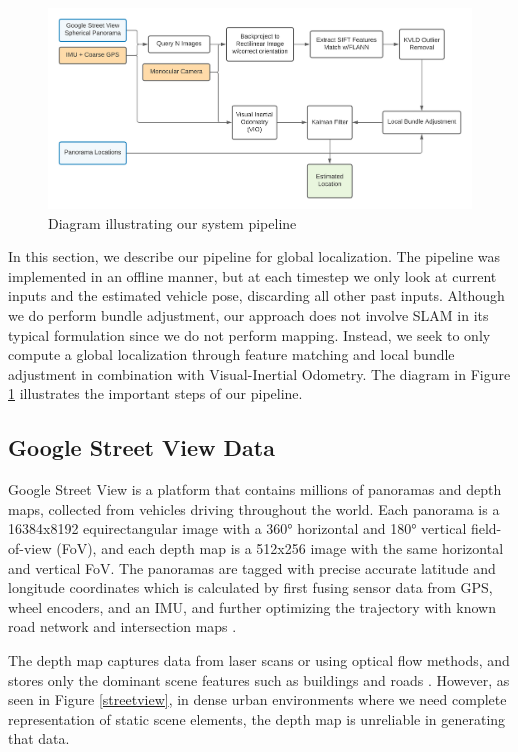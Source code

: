 \documentclass[conference]{IEEEtran}
\begin{document}
\begin{figure}[htb]
\centerline{\includegraphics[scale=0.7]{Images/system.png}}
\caption{Diagram illustrating our system pipeline}
\label{system}
\end{figure}

In this section, we describe our pipeline for global localization. The pipeline was implemented in an offline manner, but at each timestep we only look at current inputs and the estimated vehicle pose, discarding all other past inputs. Although we do perform bundle adjustment, our approach does not involve SLAM in its typical formulation since we do not perform mapping. Instead, we seek to only compute a global localization through feature matching and local bundle adjustment in combination with Visual-Inertial Odometry. The diagram in Figure \ref{system} illustrates the important steps of our pipeline.

\subsection{Google Street View Data}

Google Street View is a platform that contains millions of panoramas and depth maps, collected from vehicles driving throughout the world. Each panorama is a 16384x8192 equirectangular image with a 360° horizontal and 180° vertical field-of-view (FoV), and each depth map is a 512x256 image with the same horizontal and vertical FoV. The panoramas are tagged with precise accurate latitude and longitude coordinates which is calculated by first fusing sensor data from GPS, wheel encoders, and an IMU, and further optimizing the trajectory with known road network and intersection maps \cite{gsv}. 

The depth map captures data from laser scans or using optical flow methods, and stores only the dominant scene features such as buildings and roads \cite{gsv}. However, as seen in Figure \ref{streetview}, in dense urban environments where we need complete representation of static scene elements, the depth map is unreliable in generating that data. 
\end{document}
